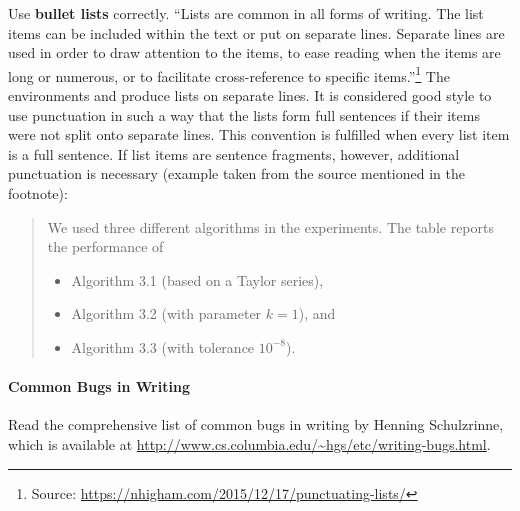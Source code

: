 Use \textbf{bullet lists} correctly. ``Lists are common in all forms of writing. The list items can be included within the text or put on separate lines. Separate lines are used in order to draw attention to the items, to ease reading when the items are long or numerous, or to facilitate cross-reference to specific items.''\footnote{Source: \url{https://nhigham.com/2015/12/17/punctuating-lists/}} The environments  and  produce lists on separate lines. It is considered good style to use punctuation in such a way that the lists form full sentences if their items were not split onto separate lines. This convention is fulfilled when every list item is a full sentence. If list items are sentence fragments, however, additional punctuation is necessary (example taken from the source mentioned in the footnote):

\begin{quote}
  We used three different algorithms in the experiments. The table reports the performance of
\begin{itemize}
\item Algorithm 3.1 (based on a Taylor series),
\item Algorithm 3.2 (with parameter \(k = 1\)), and
\item Algorithm 3.3 (with tolerance \(10^{-8}\)).
\end{itemize}
\end{quote}

\paragraph{Common Bugs in Writing}
\label{par:commonbugs}
Read the comprehensive list of common bugs in writing by Henning Schulzrinne, which is available at \url{http://www.cs.columbia.edu/~hgs/etc/writing-bugs.html}.